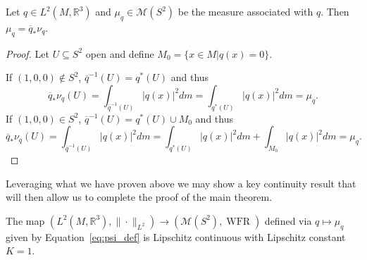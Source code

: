 \documentclass[final,hidelinks,onefignum,onetabnum]{siamart220329}
\newcommand{\R}{\mathbb{R}}
\newcommand{\WFR}{\operatorname{WFR}}
\begin{document}
\begin{lemma}
Let $q\in L^2(M,\R^3)$ and $\mu_q\in \mathcal{M}(S^2)$ be the measure associated with $q$. Then $\mu_q=\overline{q}_*\nu_q$.
\end{lemma}
\begin{proof}
Let $U\subseteq S^2$ open and define $M_0=\{x\in M|q(x)=0\}$. 

\noindent If $(1,0,0)\not\in S^2$, $\overline{q}^{-1}(U)=q^*(U)$ and thus
\[\overline{q}_*\nu_q(U)=\int_{\overline{q}^{-1}(U)} |q(x)|^2 dm=\int_{q^*(U)}|q(x)|^2dm=\mu_q.\]
If $(1,0,0)\in S^2$, $\overline{q}^{-1}(U)=q^*(U)\cup M_0$ and thus
\[\overline{q}_*\nu_q(U)=\int_{\overline{q}^{-1}(U)} |q(x)|^2 dm =\int_{q^*(U)}|q(x)|^2dm+\int_{M_0}|q(x)|^2 dm =\mu_q.\]
\end{proof}
Leveraging what we have proven above we may show a key continuity result that will then allow us to complete the proof of the main theorem.
\begin{lemma}\label{lem:continuity}
The map $(L^2(M,\R^3),\|\cdot\|_{L^2})\to (\mathcal{M}(S^2),\WFR)$ defined via $q\mapsto \mu_q$ given by Equation~\eqref{eq:psi_def} is Lipschitz continuous with Lipschitz constant $K=1$.
\end{lemma}
\end{document}
